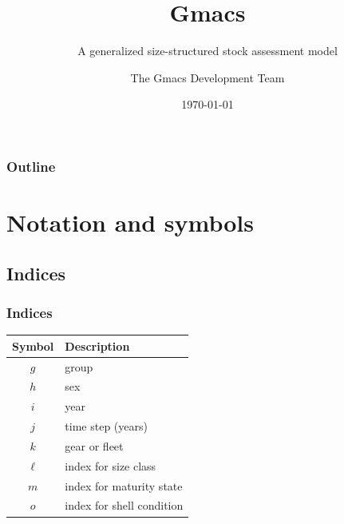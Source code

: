 \documentclass{beamer}
\title{Gmacs}
\subtitle{A generalized size-structured stock assessment model}
\author{The Gmacs Development Team}
\date{\today}
\begin{document}

\begin{frame}
\titlepage
\end{frame}


\begin{frame}
\frametitle{Outline}
\tableofcontents
\end{frame}


\section{Notation and symbols}


\subsection{Indices}
\begin{frame}
\frametitle{Indices}

\begin{table}
  \centering
  \begin{tabular}{cl}
  \hline
  Symbol  & Description \\
  \hline
      $g$ & group \\
      $h$ & sex \\
      $i$ & year \\
      $j$ & time step (years) \\
      $k$ & gear or fleet \\
      $\ell$ & index for size class \\
      $m$ & index for maturity state \\
      $o$ & index for shell condition \\
  \hline
  \end{tabular}
\end{table}

\end{frame}

\end{document}
